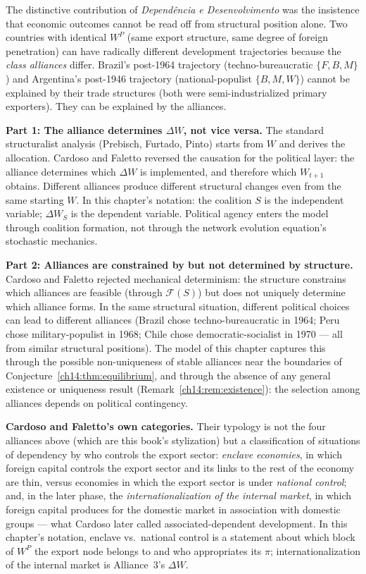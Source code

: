 \documentclass[../structural_economics_book.tex]{subfiles}
\begin{document}
The distinctive contribution of \textit{Depend\^{e}ncia e Desenvolvimento} \citep{cardoso1969dependencia} was the insistence that economic outcomes cannot be read off from structural position alone. Two countries with identical $W^P$ (same export structure, same degree of foreign penetration) can have radically different development trajectories because the \textit{class alliances} differ. Brazil's post-1964 trajectory (techno-bureaucratic $\{F, B, M\}$) and Argentina's post-1946 trajectory (national-populist $\{B, M, W\}$) cannot be explained by their trade structures (both were semi-industrialized primary exporters). They can be explained by the alliances.

\textbf{Part 1: The alliance determines $\Delta W$, not vice versa.} The standard structuralist analysis (Prebisch, Furtado, Pinto) starts from $W$ and derives the allocation. Cardoso and Faletto reversed the causation for the political layer: the alliance determines which $\Delta W$ is implemented, and therefore which $W_{t+1}$ obtains. Different alliances produce different structural changes even from the same starting $W$. In this chapter's notation: the coalition $S$ is the independent variable; $\Delta W_S$ is the dependent variable. Political agency enters the model through coalition formation, not through the network evolution equation's stochastic mechanics.

\textbf{Part 2: Alliances are constrained by but not determined by structure.} Cardoso and Faletto rejected mechanical determinism: the structure constrains which alliances are feasible (through $\mathcal{F}(S)$) but does not uniquely determine which alliance forms. In the same structural situation, different political choices can lead to different alliances (Brazil chose techno-bureaucratic in 1964; Peru chose military-populist in 1968; Chile chose democratic-socialist in 1970 --- all from similar structural positions). The model of this chapter captures this through the possible non-uniqueness of stable alliances near the boundaries of Conjecture~\ref{ch14:thm:equilibrium}, and through the absence of any general existence or uniqueness result (Remark~\ref{ch14:rem:existence}): the selection among alliances depends on political contingency.

\textbf{Cardoso and Faletto's own categories.} Their typology is not the four alliances above (which are this book's stylization) but a classification of situations of dependency by who controls the export sector: \emph{enclave economies}, in which foreign capital controls the export sector and its links to the rest of the economy are thin, versus economies in which the export sector is under \emph{national control}; and, in the later phase, the \emph{internationalization of the internal market}, in which foreign capital produces for the domestic market in association with domestic groups --- what Cardoso later called associated-dependent development. In this chapter's notation, enclave vs.\ national control is a statement about which block of $W^P$ the export node belongs to and who appropriates its $\pi$; internationalization of the internal market is Alliance~3's $\Delta W$.
\end{document}
